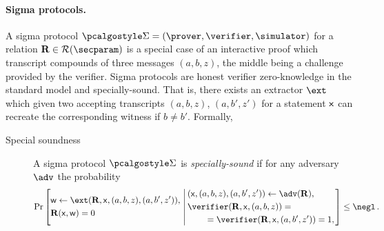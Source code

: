 \let\accentvec\vec \documentclass[runningheads]{llncs}
\begin{document}
\paragraph{Sigma protocols.}
A sigma protocol $\sigmaprot = (\prover, \verifier, \simulator)$  for a relation
$\REL \in \RELGEN(\secparam)$  is a special case of an interactive proof which transcript compounds of three messages $(a, b, z)$, the middle being a challenge provided by the verifier.
Sigma protocols are honest verifier zero-knowledge in the standard model and specially-sound. That
is, there exists an extractor $\ext$ which given two accepting transcripts $(a, b, z)$, $(a, b', z')$ for a statement $\mathsf{x}$ can recreate the corresponding witness if $b \neq b'$. Formally,
\begin{description}
	\item[Special soundness] A sigma protocol $\sigmaprot$ is \emph{specially-sound} if for any adversary $\adv$ the probability
	\[
		\Pr\left[
		\begin{aligned}
				& \wit \gets \ext(\REL, \inp, (a, b, z), (a, b', z')),\\
				& \REL(\inp, \wit) = 0
		\end{aligned}
		\,\left|\,
		\begin{aligned}
			& (\inp, (a, b, z), (a, b', z')) \gets \adv(\REL), \\
			& \verifier(\REL, \inp, (a, b, z)) = \\
			& \qquad = \verifier(\REL, \inp, (a, b', z')) = 1, \\
		\end{aligned}
		\right.\right] \leq  \negl\,.
	\]
\end{description}

\end{document}
